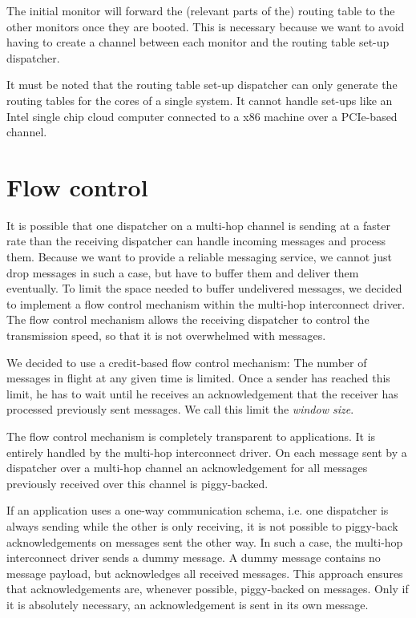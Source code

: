 \documentclass[a4paper,twoside]{report} %
\begin{document}
The initial monitor will forward the (relevant parts of the) routing table to the other monitors once they are booted. This is necessary  because we want to avoid having to create a channel between each monitor and the routing table set-up dispatcher.

It must be noted that the routing table set-up dispatcher can only generate the routing tables for the cores of a single system. It cannot handle set-ups like an Intel single chip cloud computer connected to a x86 machine over a PCIe-based channel.

\section{Flow control}
\label{section: flow control}
It is possible that one dispatcher on a multi-hop channel is sending at a faster rate than the receiving dispatcher can handle incoming messages and process them. Because we want to provide a reliable messaging service, we cannot just drop messages in such a case, but have to buffer them and deliver them eventually. To limit the space needed to buffer undelivered messages, we decided to implement a flow control mechanism within the multi-hop interconnect driver. The flow control mechanism allows the receiving dispatcher to control the transmission speed, so that it is not overwhelmed with messages.

We decided to use a credit-based flow control mechanism: The number of messages in flight at any given time is limited. Once a sender has reached this limit, he has to wait until he receives an acknowledgement that the receiver has processed previously sent messages. We call this limit the \emph{window size}.

The flow control mechanism is completely transparent to applications. It is entirely handled by the multi-hop interconnect driver. On each message sent by a dispatcher over a multi-hop channel an acknowledgement for all messages previously received over this channel is piggy-backed. 

If an application uses a one-way communication schema, i.e. one dispatcher is always sending while the other is only receiving, it is not possible to piggy-back acknowledgements on messages sent the other way. In such a case, the multi-hop interconnect driver sends a dummy message. A dummy message contains no message payload, but acknowledges all received messages. This approach ensures that acknowledgements are, whenever possible, piggy-backed on messages. Only if it is absolutely necessary, an acknowledgement is sent in its own message.
\end{document}

